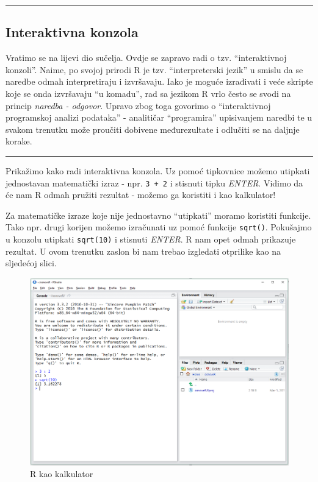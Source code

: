 \documentclass[]{book}
\theoremstyle{definition}
\theoremstyle{definition}
\theoremstyle{definition}
\theoremstyle{remark}
\begin{document}
\begin{center}\rule{0.5\linewidth}{\linethickness}\end{center}

\subsection{Interaktivna konzola}\label{interaktivna-konzola}

Vratimo se na lijevi dio sučelja. Ovdje se zapravo radi o tzv.
``interaktivnoj konzoli''. Naime, po svojoj prirodi R je tzv.
``interpreterski jezik'' u smislu da se naredbe odmah interpretiraju i
izvršavaju. Iako je moguće izrađivati i veće skripte koje se onda
izvršavaju ``u komadu'', rad sa jezikom R vrlo često se svodi na princip
\emph{naredba - odgovor}. Upravo zbog toga govorimo o ``interaktivnoj
programskoj analizi podataka'' - analitičar ``programira'' upisivanjem
naredbi te u svakom trenutku može proučiti dobivene međurezultate i
odlučiti se na daljnje korake.

\begin{center}\rule{0.5\linewidth}{\linethickness}\end{center}

Prikažimo kako radi interaktivna konzola. Uz pomoć tipkovnice možemo
utipkati jednostavan matematički izraz - npr. \texttt{3\ +\ 2} i
stisnuti tipku \emph{ENTER}. Vidimo da će nam R odmah pružiti rezultat -
možemo ga koristiti i kao kalkulator!

Za matematičke izraze koje nije jednostavno ``utipkati'' moramo
koristiti funkcije. Tako npr. drugi korijen možemo izračunati uz pomoć
funkcije \texttt{sqrt()}. Pokušajmo u konzolu utipkati \texttt{sqrt(10)}
i stisnuti \emph{ENTER}. R nam opet odmah prikazuje rezultat. U ovom
trenutku zaslon bi nam trebao izgledati otprilike kao na sljedećoj
slici.

\begin{figure}
\centering
\includegraphics{figures/RStudio2.png}
\caption{\label{fig:unnamed-chunk-4}R kao kalkulator}
\end{figure}
\end{document}
